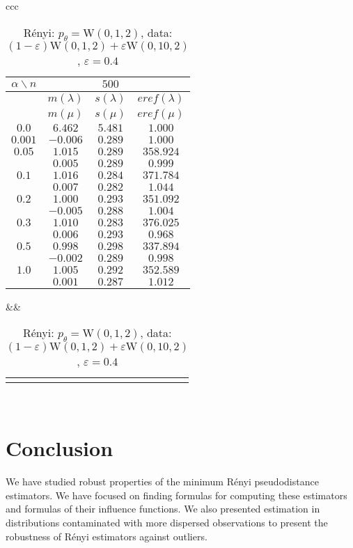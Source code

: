 {\begin{table}[htb] \footnotesize
\begin{center}
\begin{tabular}{ccc}
	\begin{tabular}{|c|ccc|} 
	\hline 
	$\alpha\backslash n$ &&  $500$ & \\ 
	\hline 
	& $m(\lambda)$ & $s(\lambda)$ & $eref(\lambda)$ \\ 
	& $m(\mu)$ & $s(\mu)$ & $eref(\mu)$ \\ 
	\hline 
	$0.0$ & $ 6.462 $ & $ 5.481 $ & $ 1.000 $\\ 
	$0.001$ & $ -0.006 $ & $ 0.289 $ & $ 1.000 $\\ 
	\hline 
	$0.05$ & $ 1.015 $ & $ 0.289 $ & $ 358.924 $\\ 
	 & $ 0.005 $ & $ 0.289 $ & $ 0.999 $\\ 
	\hline 
	$0.1$ & $ 1.016 $ & $ 0.284 $ & $ 371.784 $\\ 
	& $ 0.007 $ & $ 0.282 $ & $ 1.044 $\\ 
	\hline 
	$0.2$ & $ 1.000 $ & $ 0.293 $ & $ 351.092 $\\ 
	& $ -0.005 $ & $ 0.288 $ & $ 1.004 $\\ 
	\hline 
	$0.3$ & $ 1.010 $ & $ 0.283 $ & $ 376.025 $\\ 
	 & $ 0.006 $ & $ 0.293 $ & $ 0.968 $\\ 
	\hline 
	$0.5$ & $ 0.998 $ & $ 0.298 $ & $ 337.894 $\\ 
	 & $ -0.002 $ & $ 0.289 $ & $ 0.998 $\\ 
	\hline 
	$1.0$ & $ 1.005 $ & $ 0.292 $ & $ 352.589 $\\  
	 & $ 0.001 $ & $ 0.287 $ & $ 1.012 $\\
	\hline 
	\end{tabular}
&&
	\begin{tabular}{c}
		\epsfig{file=Weibull-e04-eref.eps, height=2in} 
	\end{tabular}
\\
\end{tabular}
\end{center}
\caption{R\'{e}nyi: $p_\theta = \mathrm{W}(0,1,2)$, data: $(1-\varepsilon)\mathrm{W}(0,1,2) + \varepsilon \mathrm{W}(0,10,2)$, $\varepsilon =  0.4$} 
\label{tabJK:weibull-eref}
\end{table}


\section{Conclusion}
We have studied robust properties of the minimum R\'enyi pseudodistance estimators. We have focused on finding formulas for computing these estimators and formulas of their influence functions. We also presented estimation in distributions contaminated with more dispersed observations to present the robustness of R\'enyi estimators against outliers.


}
